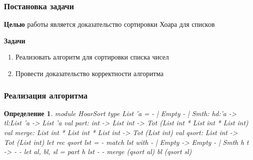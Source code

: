 \documentclass{beamer}
\newtheorem{rudefinition}{Определение}
\begin{document}
\begin{frame}
  \transwipe[direction=90]
  \frametitle{Постановка задачи}
  \textbf{Целью} работы является доказательство сортировки Хоара для списков

  \textbf{Задачи}
  \begin{enumerate}
    \item Реализовать алгоритм для сортировки списка чисел
    \item Провести доказательство корректности алгоритма
  \end{enumerate}
\end{frame}

\begin{frame}
  \transwipe[direction=90]
  \frametitle{Реализация алгоритма}
  \begin{rudefinition}
    module HoarSort\linebreak
    type List 'a =\linebreak
     - | Empty\linebreak
     - | Smth: hd:'a -> tl:List 'a -> List 'a\linebreak
    val part: int -> List int -> Tot (List int * List int * List int)\linebreak
    val merge: List int * List int * List int -> Tot (List int)\linebreak
    val qsort: List int -> Tot (List int)\linebreak
    let rec qsort lst =\linebreak
     - match lst with\linebreak
     - | Empty -> Empty\linebreak
     - | Smth h t ->\linebreak
     -  - let al, bl, sl = part h lst\linebreak
     -  - merge (qsort al) bl (qsort sl)\linebreak
  \end{rudefinition}
\end{frame}
\end{document}
